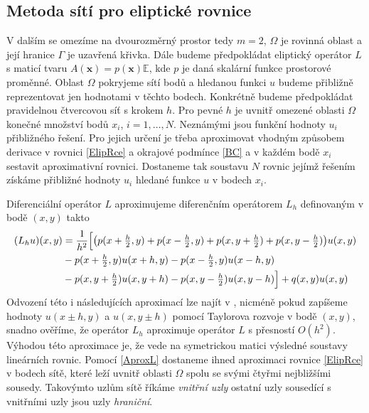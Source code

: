 \documentclass[a4paper,10pt]{article}
\def\vc#1{\mathbf{\boldsymbol{#1}}}     %
\def\tn#1{{\mathbb{#1}}}    %
\begin{document}
\subsection{Metoda sítí pro eliptické rovnice}
V dalším se omezíme na dvourozměrný prostor tedy $m=2$, $\Omega$ je rovinná oblast a její hranice $\Gamma$ je 
uzavřená křivka.
Dále budeme předpokládat eliptický operátor $L$ s maticí tvaru $A(\vc x)=p(\vc x)\tn E$, kde $p$ je daná skalární funkce
prostorové proměnné.
Oblast $\Omega$ pokryjeme sítí bodů a hledanou funkci $u$ budeme přibližně reprezentovat jen 
hodnotami v těchto bodech. Konkrétně budeme předpokládat pravidelnou čtvercovou síť s krokem $h$.
Pro pevné $h$ je uvnitř omezené oblasti $\Omega$ konečné množství bodů $x_i$, $i=1,\dots, N$.
Neznámými jsou funkční hodnoty $u_i$ přibližného řešení. Pro jejich určení je třeba aproximovat
vhodným způsobem derivace v rovnici \eqref{ElipRce} a okrajové podmínce \eqref{BC} a v každém bodě
$x_i$ sestavit aproximativní rovnici. Dostaneme tak soustavu $N$ rovnic jejímž řešením získáme přibližné hodnoty $u_i$ hledané funkce $u$ v bodech $x_i$.

Diferenciální operátor $L$ aproximujeme diferenčním operátorem $L_h$ definovaným v bodě $(x,y)$ takto
\begin{align}\label{AproxL}
  (L_h u)(x,y)&=\frac1{h^2}\Big[\big(p(x+\tfrac h2,y)+p(x-\tfrac h2,y)+p(x,y+\tfrac h2)+p(x,y-\tfrac h2)\big) u(x,y)\\
\notag        &-p(x+\tfrac h2,y)u(x+h,y)-p(x-\tfrac h2,y)u(x-h,y)\\
\notag        &-p(x,y+\tfrac h2)u(x,y+h)-p(x,y-\tfrac h2)u(x,y-h)\Big] + q(x,y)u(x,y)
\end{align}
Odvození této i následujících aproximací lze najít v \cite{Vitasek}, nicméně pokud zapíšeme hodnoty $u(x\pm h,y)$ a 
$u(x,y\pm h)$ pomocí Taylorova rozvoje v bodě $(x,y)$, snadno ověříme, že operátor $L_h$ aproximuje operátor $L$
s přesností $O(h^2)$. Výhodou této aproximace je, že vede na symetrickou matici výsledné soustavy lineárních rovnic.
Pomocí \eqref{AproxL} dostaneme ihned aproximaci rovnice \eqref{ElipRce} v bodech sítě, které leží 
uvnitř oblasti $\Omega$ spolu se svými čtyřmi nejbližšími sousedy. Takovýmto uzlům sítě říkáme {\it vnitřní uzly}
ostatní uzly sousedící s vnitřními uzly jsou uzly {\it hraniční}.
\end{document}
